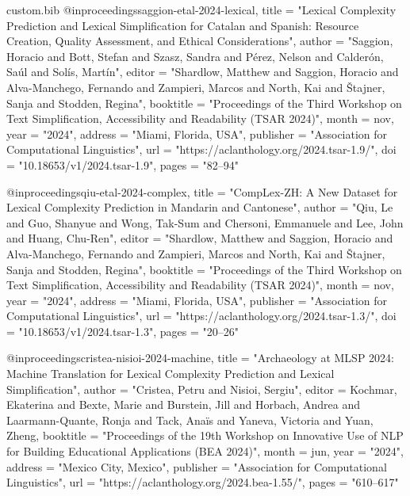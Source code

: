 \begin{filecontents*}[overwrite]{custom.bib}
@inproceedings{saggion-etal-2024-lexical,
    title = "Lexical Complexity Prediction and Lexical Simplification for {C}atalan and {S}panish: Resource Creation, Quality Assessment, and Ethical Considerations",
    author = "Saggion, Horacio  and
      Bott, Stefan  and
      Szasz, Sandra  and
      P{\'e}rez, Nelson  and
      Calder{\'o}n, Sa{\'u}l  and
      Sol{\'i}s, Mart{\'i}n",
    editor = "Shardlow, Matthew  and
      Saggion, Horacio  and
      Alva-Manchego, Fernando  and
      Zampieri, Marcos  and
      North, Kai  and
      {\v{S}}tajner, Sanja  and
      Stodden, Regina",
    booktitle = "Proceedings of the Third Workshop on Text Simplification, Accessibility and Readability (TSAR 2024)",
    month = nov,
    year = "2024",
    address = "Miami, Florida, USA",
    publisher = "Association for Computational Linguistics",
    url = "https://aclanthology.org/2024.tsar-1.9/",
    doi = "10.18653/v1/2024.tsar-1.9",
    pages = "82--94"
}

@inproceedings{qiu-etal-2024-complex,
    title = "{C}omp{L}ex-{ZH}: A New Dataset for Lexical Complexity Prediction in {M}andarin and {C}antonese",
    author = "Qiu, Le  and
      Guo, Shanyue  and
      Wong, Tak-Sum  and
      Chersoni, Emmanuele  and
      Lee, John  and
      Huang, Chu-Ren",
    editor = "Shardlow, Matthew  and
      Saggion, Horacio  and
      Alva-Manchego, Fernando  and
      Zampieri, Marcos  and
      North, Kai  and
      {\v{S}}tajner, Sanja  and
      Stodden, Regina",
    booktitle = "Proceedings of the Third Workshop on Text Simplification, Accessibility and Readability (TSAR 2024)",
    month = nov,
    year = "2024",
    address = "Miami, Florida, USA",
    publisher = "Association for Computational Linguistics",
    url = "https://aclanthology.org/2024.tsar-1.3/",
    doi = "10.18653/v1/2024.tsar-1.3",
    pages = "20--26"
}

@inproceedings{cristea-nisioi-2024-machine,
    title = "Archaeology at {MLSP} 2024: Machine Translation for Lexical Complexity Prediction and Lexical Simplification",
    author = "Cristea, Petru  and
      Nisioi, Sergiu",
    editor = {Kochmar, Ekaterina  and
      Bexte, Marie  and
      Burstein, Jill  and
      Horbach, Andrea  and
      Laarmann-Quante, Ronja  and
      Tack, Ana{\"i}s  and
      Yaneva, Victoria  and
      Yuan, Zheng},
    booktitle = "Proceedings of the 19th Workshop on Innovative Use of NLP for Building Educational Applications (BEA 2024)",
    month = jun,
    year = "2024",
    address = "Mexico City, Mexico",
    publisher = "Association for Computational Linguistics",
    url = "https://aclanthology.org/2024.bea-1.55/",
    pages = "610--617"
}


\end{filecontents*}
